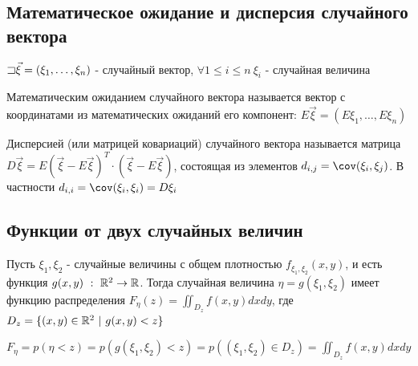 \documentclass[12pt]{article}
\begin{document}
    \subsection{Математическое ожидание и дисперсия случайного вектора}
    
    $\mathord{\sqsupset} \vec{\xi} = (\xi_1, \dots, \xi_n)$ - случайный вектор, 
    $\forall 1 \leq i \leq n \ \xi_i$ - случайная величина

    \Def Математическим ожиданием случайного вектора называется вектор с координатами 
    из математических ожиданий его компонент: $E\vec{\xi} = (E\xi_1, \dots, E\xi_n)$

    \Def Дисперсией (или матрицей ковариаций) случайного вектора называется матрица
    $D\vec{\xi} = E(\vec{\xi} - E\vec{\xi})^T \cdot (\vec{\xi} - E\vec{\xi})$, состоящая
    из элементов $d_{i, j} = \cov (\xi_i, \xi_j)$. В частности $d_{i, i} = \cov (\xi_i, \xi_i) = D\xi_i$

    \subsection{Функции от двух случайных величин}

    \begin{MyTheorem}
        \Ths Пусть $\xi_1, \xi_2$ - случайные величины с общем плотностью $f_{\xi_1, \xi_2}(x, y)$, и есть функция
        $g(x, y) \ : \ \mathbb{R}^2 \rightarrow \mathbb{R}$. Тогда случайная величина $\eta = g(\xi_1, \xi_2)$ имеет
        функцию распределения $F_{\eta}(z) = \iint_{D_z} f(x, y)dxdy$, 
        где $D_z = \{(x, y) \in \mathbb{R}^2 \ | \ g(x, y) < z\}$
    \end{MyTheorem}

    \begin{MyProof}
        $F_\eta = p(\eta < z) = p(g(\xi_1, \xi_2) < z) = p((\xi_1, \xi_2) \in D_z) = \iint_{D_z} f(x, y) dxdy$
    \end{MyProof}
\end{document}
